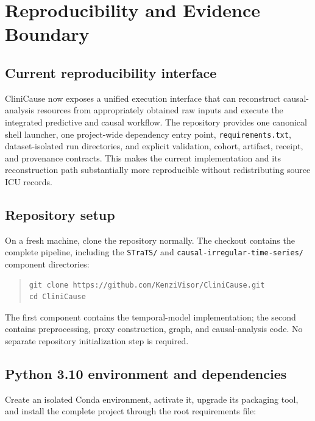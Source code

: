 \chapter{Reproducibility and Evidence Boundary}
\label{app:reproducibility-evidence-boundary}

\section{Current reproducibility interface}

CliniCause now exposes a unified execution interface that can
reconstruct causal-analysis resources from appropriately obtained raw inputs
and execute the integrated predictive and causal workflow. The repository
provides one canonical shell launcher, one project-wide dependency entry point,
\texttt{requirements.txt}, dataset-isolated run
directories, and explicit validation, cohort, artifact, receipt, and provenance
contracts. This makes the current implementation and its reconstruction path
substantially more reproducible without redistributing source ICU records.

\section{Repository setup}

On a fresh machine, clone the repository normally. The checkout contains the
complete pipeline, including the \texttt{STraTS/} and
\texttt{causal-irregular-time-series/} component directories:

\begin{quote}\small
\begin{verbatim}
git clone https://github.com/KenziVisor/CliniCause.git
cd CliniCause
\end{verbatim}
\end{quote}

The first component contains the temporal-model implementation; the second
contains preprocessing, proxy construction, graph, and causal-analysis code.
No separate repository initialization step is required.

\section{Python 3.10 environment and dependencies}

Create an isolated Conda environment, activate it, upgrade its packaging tool,
and install the complete project through the root requirements file:

